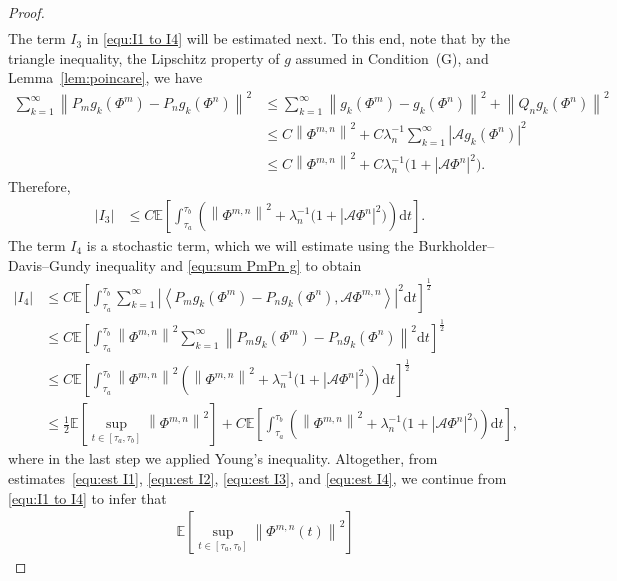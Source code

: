 \documentclass[11pt, reqno]{amsart}
\theoremstyle{definition}
\numberwithin{equation}{section}
\newcommand{\bb}{\mathbb}
\newcommand{\dt}{\mathrm{d}t}
\newcommand{\norm}[1]{\left\|{#1}\right\|}
\newcommand{\inpro}[2]{\left\langle#1,#2\right\rangle}
\newcommand{\abs}[1]{\left|{#1}\right|}
\begin{document}
\begin{proof}
\begin{align}
\end{align}
The term $I_3$ in \eqref{equ:I1 to I4} will be estimated next. To this end, note that by the triangle inequality, the Lipschitz property of $g$ assumed in Condition~(G), and Lemma~\ref{lem:poincare}, we have
\begin{align}\label{equ:sum PmPn g}
	\sum_{k=1}^\infty \norm{P_m g_k(\Phi^m)- P_n g_k(\Phi^n)}^2
	&\leq
	\sum_{k=1}^\infty \norm{g_k(\Phi^m)- g_k(\Phi^n)}^2 + \norm{Q_n g_k(\Phi^n)}^2
	\nonumber\\
	&\leq
	C \norm{\Phi^{m,n}}^2 + C \lambda_n^{-1} \sum_{k=1}^\infty \abs{\mathcal{A} g_k(\Phi^n)}^2
	\nonumber\\
	&\leq
	C \norm{\Phi^{m,n}}^2 + C\lambda_n^{-1} \big(1+\abs{\mathcal{A} \Phi^n}^2\big).
\end{align}
Therefore,
\begin{align}\label{equ:est I3}
	\abs{I_3}
	&\leq
	C \bb{E} \left[\int_{\tau_a}^{\tau_b} \left( \norm{\Phi^{m,n}}^2 + \lambda_n^{-1} \big(1+\abs{\mathcal{A} \Phi^n}^2\big) \right) \dt \right].
\end{align}
The term $I_4$ is a stochastic term, which we will estimate using the Burkholder--Davis--Gundy inequality and \eqref{equ:sum PmPn g} to obtain
\begin{align}\label{equ:est I4}
	\abs{I_4}
	&\leq
	C \bb{E}\left[ \int_{\tau_a}^{\tau_b} \sum_{k=1}^\infty \abs{\inpro{P_m g_k(\Phi^m)- P_n g_k(\Phi^n)}{\mathcal{A} \Phi^{m,n}}}^2 \dt\right]^{\frac12}
	\nonumber\\
	&\leq
	C \bb{E} \left[ \int_{\tau_a}^{\tau_b} \norm{\Phi^{m,n}}^2 \sum_{k=1}^\infty \norm{P_m g_k(\Phi^m)-P_n g_k(\Phi^n)}^2 \dt \right]^{\frac12}
	\nonumber\\
	&\leq
	C \bb{E}\left[ \int_{\tau_a}^{\tau_b} \norm{\Phi^{m,n}}^2 \left(\norm{\Phi^{m,n}}^2 + \lambda_n^{-1} \big(1+ \abs{\mathcal{A}\Phi^n}^2 \big) \right) \dt \right]^{\frac12}
	\nonumber\\
	&\leq
	\frac12 \bb{E}\left[ \sup_{t\in [\tau_a,\tau_b]} \norm{\Phi^{m,n}}^2 \right] 
	+
	C\bb{E} \left[\int_{\tau_a}^{\tau_b} \left( \norm{\Phi^{m,n}}^2 + \lambda_n^{-1} \big(1+ \abs{\mathcal{A}\Phi^n}^2 \big) \right) \dt \right],
\end{align}
where in the last step we applied Young's inequality. Altogether, from estimates~\eqref{equ:est I1}, \eqref{equ:est I2}, \eqref{equ:est I3}, and \eqref{equ:est I4}, we continue from \eqref{equ:I1 to I4} to infer that
\begin{align*}
	&\bb{E} \left[ \sup_{t\in [\tau_a,\tau_b]} \norm{\Phi^{m,n}(t)}^2 \right] 

\end{align*}
\end{proof}
\end{document}
